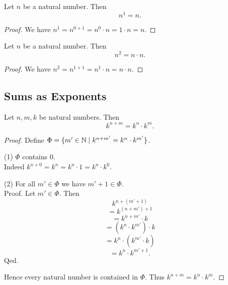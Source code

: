 \documentclass[10pt]{article}
\begin{document}
  \begin{forthel}
    \begin{proposition}
      Let $n$ be a natural number.
      Then \[ n^{1} = n. \]
    \end{proposition}
    \begin{proof}
      We have $n^{1}
        = n^{0 + 1}
        = n^{0} \cdot n
        = 1 \cdot n
        = n$.
    \end{proof}
  \end{forthel}

  \begin{forthel}
    \begin{proposition}
      Let $n$ be a natural number.
      Then \[ n^{2} = n \cdot n. \]
    \end{proposition}
    \begin{proof}
      We have $n^{2}
        = n^{1 + 1}
        = n^{1} \cdot n
        = n \cdot n$.
    \end{proof}
  \end{forthel}


  \subsection{Sums as Exponents}

  \begin{forthel}
    \begin{proposition}
      Let $n, m, k$ be natural numbers.
      Then \[ k^{n + m} = k^{n} \cdot k^{m}. \]
    \end{proposition}
    \begin{proof}
      Define $\Phi = \{ m' \in \mathbb{N} \mid k^{n + m'} = k^{n} \cdot k^{m'} \}$.

      (1) $\Phi$ contains $0$. \\
      Indeed $k^{n + 0}
        = k^{n}
        = k^{n} \cdot 1
        = k^{n} \cdot k^{0}$.

      (2) For all $m' \in \Phi$ we have $m' + 1 \in \Phi$. \\
      Proof.
        Let $m' \in \Phi$.
        Then
        \[  k^{n + (m' + 1)}                  \]
        \[    = k^{(n + m') + 1}              \]
        \[    = k^{n + m'} \cdot k            \]
        \[    = (k^{n} \cdot k^{m'}) \cdot k  \]
        \[    = k^{n} \cdot (k^{m'} \cdot k)  \]
        \[    = k^{n} \cdot k^{m' + 1}.       \]
      Qed.

      Hence every natural number is contained in $\Phi$.
      Thus $k^{n + m} = k^{n} \cdot k^{m}$.
    \end{proof}
  \end{forthel}
\end{document}
